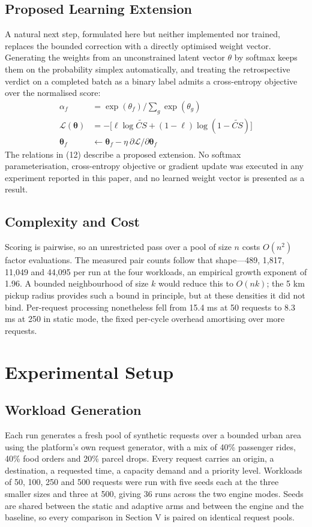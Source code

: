 \documentclass[conference]{IEEEtran}
\begin{document}
\subsection{Proposed Learning Extension}
A natural next step, formulated here but neither implemented nor trained, replaces the bounded correction with a directly optimised weight vector. Generating the weights from an unconstrained latent vector $\theta$ by softmax keeps them on the probability simplex automatically, and treating the retrospective verdict on a completed batch as a binary label admits a cross-entropy objective over the normalised score:
\begin{equation}
\begin{aligned}
\alpha_f &= \exp(\theta_f) \Big/ {\sum}_g \exp(\theta_g) \\
\mathscr{L}(\boldsymbol{\theta}) &= - \big[ \ell \log \widetilde{CS} + (1 - \ell) \log (1 - \widetilde{CS}) \big] \\
\boldsymbol{\theta}_{\!f} &\gets \boldsymbol{\theta}_{\!f} - \eta \: \partial \mathscr{L} / \partial \boldsymbol{\theta}_{\!f}
\end{aligned}
\end{equation}
The relations in (12) describe a proposed extension. No softmax parameterisation, cross-entropy objective or gradient update was executed in any experiment reported in this paper, and no learned weight vector is presented as a result.

\subsection{Complexity and Cost}
Scoring is pairwise, so an unrestricted pass over a pool of size $n$ costs $O(n^2)$ factor evaluations. The measured pair counts follow that shape---489, 1,817, 11,049 and 44,095 per run at the four workloads, an empirical growth exponent of 1.96. A bounded neighbourhood of size $k$ would reduce this to $O(nk)$; the 5 km pickup radius provides such a bound in principle, but at these densities it did not bind. Per-request processing nonetheless fell from 15.4 ms at 50 requests to 8.3 ms at 250 in static mode, the fixed per-cycle overhead amortising over more requests.

\section{Experimental Setup}
\subsection{Workload Generation}
Each run generates a fresh pool of synthetic requests over a bounded urban area using the platform's own request generator, with a mix of 40\% passenger rides, 40\% food orders and 20\% parcel drops. Every request carries an origin, a destination, a requested time, a capacity demand and a priority level. Workloads of 50, 100, 250 and 500 requests were run with five seeds each at the three smaller sizes and three at 500, giving 36 runs across the two engine modes. Seeds are shared between the static and adaptive arms and between the engine and the baseline, so every comparison in Section V is paired on identical request pools.
\end{document}
